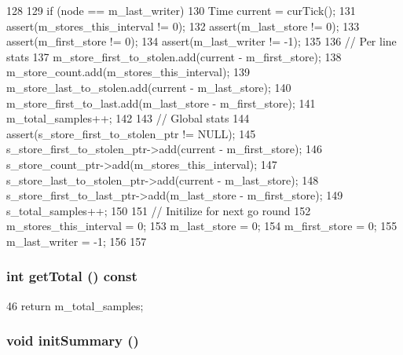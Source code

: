 \begin{DoxyCode}
128 {
129     if (node == m_last_writer) {
130         Time current = curTick();
131         assert(m_stores_this_interval != 0);
132         assert(m_last_store != 0);
133         assert(m_first_store != 0);
134         assert(m_last_writer != -1);
135 
136         // Per line stats
137         m_store_first_to_stolen.add(current - m_first_store);
138         m_store_count.add(m_stores_this_interval);
139         m_store_last_to_stolen.add(current - m_last_store);
140         m_store_first_to_last.add(m_last_store - m_first_store);
141         m_total_samples++;
142 
143         // Global stats
144         assert(s_store_first_to_stolen_ptr != NULL);
145         s_store_first_to_stolen_ptr->add(current - m_first_store);
146         s_store_count_ptr->add(m_stores_this_interval);
147         s_store_last_to_stolen_ptr->add(current - m_last_store);
148         s_store_first_to_last_ptr->add(m_last_store - m_first_store);
149         s_total_samples++;
150 
151         // Initilize for next go round
152         m_stores_this_interval = 0;
153         m_last_store = 0;
154         m_first_store = 0;
155         m_last_writer = -1;
156     }
157 }
\end{DoxyCode}
\hypertarget{classStoreTrace_af262952019c2e5f874224855cf7fb8bd}{
\subsubsection[{getTotal}]{\setlength{\rightskip}{0pt plus 5cm}int getTotal () const}}
\label{classStoreTrace_af262952019c2e5f874224855cf7fb8bd}



\begin{DoxyCode}
46 { return m_total_samples; }
\end{DoxyCode}
\hypertarget{classStoreTrace_aeb8b49a9925d3114c99e331d6be3e93b}{
\subsubsection[{initSummary}]{\setlength{\rightskip}{0pt plus 5cm}void initSummary ()}}
\label{classStoreTrace_aeb8b49a9925d3114c99e331d6be3e93b}




